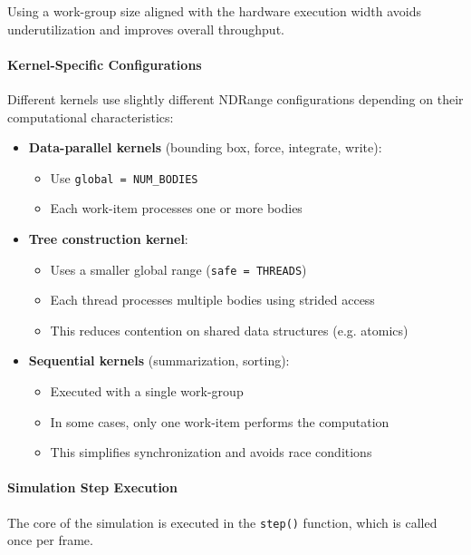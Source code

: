 \documentclass[12pt]{article}
\begin{document}
Using a work-group size aligned with the hardware execution width avoids
underutilization and improves overall throughput.

\paragraph{Kernel-Specific Configurations}

Different kernels use slightly different NDRange configurations depending
on their computational characteristics:

\begin{itemize}
    \item \textbf{Data-parallel kernels} (bounding box, force, integrate, write):
    \begin{itemize}
        \item Use \texttt{global = NUM\_BODIES}
        \item Each work-item processes one or more bodies
    \end{itemize}

    \item \textbf{Tree construction kernel}:
    \begin{itemize}
        \item Uses a smaller global range (\texttt{safe = THREADS})
        \item Each thread processes multiple bodies using strided access
        \item This reduces contention on shared data structures (e.g. atomics)
    \end{itemize}

    \item \textbf{Sequential kernels} (summarization, sorting):
    \begin{itemize}
        \item Executed with a single work-group
        \item In some cases, only one work-item performs the computation
        \item This simplifies synchronization and avoids race conditions
    \end{itemize}
\end{itemize}

\paragraph{Simulation Step Execution}

The core of the simulation is executed in the \texttt{step()} function,
which is called once per frame.
\end{document}
